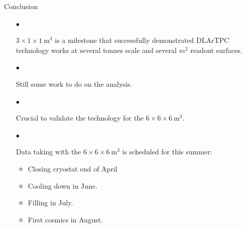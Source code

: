 \documentclass[10pt]{beamer}
\begin{document}
    \begin{frame}{Conclusion}
	    	\begin{itemize}
	    		\item[$\bullet$] \begin{normalsize}$3 \times 1 \times \SI{1}{\meter\cubed}$ is a milestone that successfully demonstrated DLArTPC technology works at several tonnes scale and several $m^2$ readout surfaces.\end{normalsize}
	    		\item[$\bullet$] \begin{normalsize}Still some work to do on the analysis.\end{normalsize}
	    		\item[$\bullet$] \begin{normalsize}Crucial to validate the technology for the $6 \times 6 \times \SI{6}{\meter\cubed}$.\end{normalsize}
	    		\item[$\bullet$] \begin{normalsize}Data taking with the $6 \times 6 \times \SI{6}{\meter\cubed}$ is scheduled for this summer:\end{normalsize}
	    		\begin{itemize}
	    			\item \begin{footnotesize}Closing cryostat end of April\end{footnotesize}
	    			\item \begin{footnotesize}Cooling down in June.\end{footnotesize}
	    			\item \begin{footnotesize}Filling in July.\end{footnotesize}
		    		\item \begin{footnotesize}First cosmics in August.\end{footnotesize}
	    		\end{itemize}
	    	\end{itemize}
    \end{frame}
    
\end{document}
